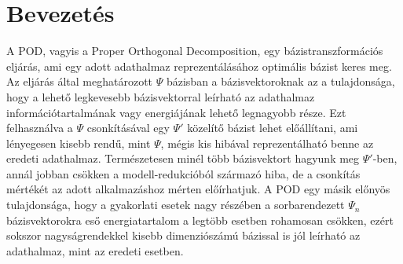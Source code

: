 
\newcommand\adj[1]{#1^{\mathrm{H}}}

\author{Szilágyi Gábor \\\vspace{2cm}\\ Konzulens: Dr. Bilicz Sándor}
\date{Budapest, \today}



    \maketitle
    \setcounter{page}{2}
    \section{Bevezetés}
            A POD, vagyis a Proper Orthogonal Decomposition, egy bázistranszformációs eljárás, ami egy adott adathalmaz reprezentálásához optimális bázist keres meg. Az eljárás által meghatározott $\Psi$ bázisban a bázisvektoroknak az a tulajdonsága, hogy a lehető legkevesebb bázisvektorral leírható az adathalmaz információtartalmának vagy energiájának lehető legnagyobb része. Ezt felhasználva a $\Psi$ csonkításával egy $\Psi'$ közelítő bázist lehet előállítani, ami lényegesen kisebb rendű, mint $\Psi$, mégis kis hibával reprezentálható benne az eredeti adathalmaz. Természetesen minél több bázisvektort hagyunk meg $\Psi'$-ben, annál jobban csökken a modell-redukcióból származó hiba, de a csonkítás mértékét az adott alkalmazáshoz mérten előírhatjuk. A POD egy másik előnyös tulajdonsága, hogy a gyakorlati esetek nagy részében a sorbarendezett $\Psi_n$ bázisvektorokra eső energiatartalom a legtöbb esetben rohamosan csökken, ezért sokszor nagyságrendekkel kisebb dimenziószámú bázissal is jól leírható az adathalmaz, mint az eredeti esetben.
